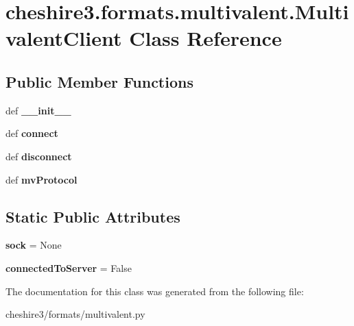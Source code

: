 \hypertarget{classcheshire3_1_1formats_1_1multivalent_1_1_multivalent_client}{\section{cheshire3.\-formats.\-multivalent.\-Multivalent\-Client Class Reference}
\label{classcheshire3_1_1formats_1_1multivalent_1_1_multivalent_client}
}
\subsection*{Public Member Functions}
\begin{DoxyCompactItemize}
\item 
\hypertarget{classcheshire3_1_1formats_1_1multivalent_1_1_multivalent_client_ae6a52844844df9a4796dcb362870b662}{def {\bfseries \-\_\-\-\_\-init\-\_\-\-\_\-}}\label{classcheshire3_1_1formats_1_1multivalent_1_1_multivalent_client_ae6a52844844df9a4796dcb362870b662}

\item 
\hypertarget{classcheshire3_1_1formats_1_1multivalent_1_1_multivalent_client_aea9d309693d95a0fb8ed35de5ef32a80}{def {\bfseries connect}}\label{classcheshire3_1_1formats_1_1multivalent_1_1_multivalent_client_aea9d309693d95a0fb8ed35de5ef32a80}

\item 
\hypertarget{classcheshire3_1_1formats_1_1multivalent_1_1_multivalent_client_ada632f6ee5beb1e2d073cba27d546fa2}{def {\bfseries disconnect}}\label{classcheshire3_1_1formats_1_1multivalent_1_1_multivalent_client_ada632f6ee5beb1e2d073cba27d546fa2}

\item 
\hypertarget{classcheshire3_1_1formats_1_1multivalent_1_1_multivalent_client_ac1d5ee6d4add4368d052a9af49ec6dba}{def {\bfseries mv\-Protocol}}\label{classcheshire3_1_1formats_1_1multivalent_1_1_multivalent_client_ac1d5ee6d4add4368d052a9af49ec6dba}

\end{DoxyCompactItemize}
\subsection*{Static Public Attributes}
\begin{DoxyCompactItemize}
\item 
\hypertarget{classcheshire3_1_1formats_1_1multivalent_1_1_multivalent_client_a804e52f9b60f0f14f72bb860126a85e3}{{\bfseries sock} = None}\label{classcheshire3_1_1formats_1_1multivalent_1_1_multivalent_client_a804e52f9b60f0f14f72bb860126a85e3}

\item 
\hypertarget{classcheshire3_1_1formats_1_1multivalent_1_1_multivalent_client_aaa5b755e6c204a2c19c1f94e9610af9e}{{\bfseries connected\-To\-Server} = False}\label{classcheshire3_1_1formats_1_1multivalent_1_1_multivalent_client_aaa5b755e6c204a2c19c1f94e9610af9e}

\end{DoxyCompactItemize}


The documentation for this class was generated from the following file\-:\begin{DoxyCompactItemize}
\item 
cheshire3/formats/multivalent.\-py\end{DoxyCompactItemize}
